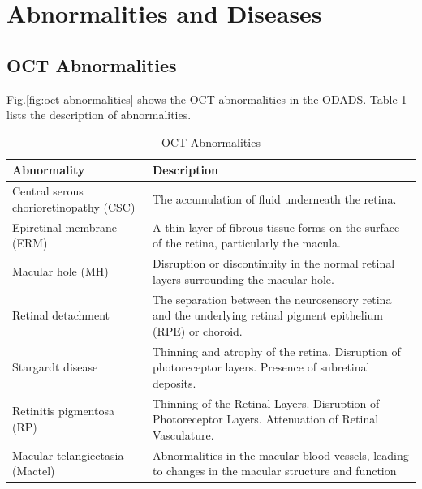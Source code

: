 \documentclass{article}
\begin{document}
	\pagebreak
	\section{Abnormalities and Diseases} \label{sec:ab_di}
	
	\subsection{OCT Abnormalities}
	
		Fig.\ref{fig:oct-abnormalities} shows the OCT abnormalities in the ODADS.
		Table \ref{tb:oct-abnormalites} lists the description of abnormalities.
		
		{
			\fontsize{9}{12}\selectfont
			{
				\begin{longtable}{lp{3.8in}}
				\caption{OCT Abnormalities}
				\label{tb:oct-abnormalites}\\
				\toprule
				Abnormality&Description\\
				\toprule
				
				\multicolumn{1}{l}{Central serous chorioretinopathy (CSC)}
				& \multicolumn{1}{l}{The accumulation of fluid underneath the retina.}\\
				
				\multicolumn{1}{l}{Epiretinal membrane (ERM)}
				& A thin layer of fibrous tissue forms on the surface of the retina, particularly the macula.\\
				
				\multicolumn{1}{l}{Macular hole (MH)}
				& Disruption or discontinuity in the normal retinal layers surrounding the macular hole.\\
				
				\multicolumn{1}{l}{Retinal detachment}
				& The separation between the neurosensory retina and the underlying retinal pigment epithelium (RPE) or choroid.\\

				\multicolumn{1}{l}{Stargardt disease}
				& Thinning and atrophy of the retina. Disruption of photoreceptor layers. Presence of subretinal deposits.\\

				\multicolumn{1}{l}{Retinitis pigmentosa (RP)}
				& Thinning of the Retinal Layers. Disruption of Photoreceptor Layers. Attenuation of Retinal Vasculature.\\

				\multicolumn{1}{l}{Macular telangiectasia (Mactel)}
				& Abnormalities in the macular blood vessels, leading to changes in the macular structure and function\\


\end{longtable}}}
\end{document}
